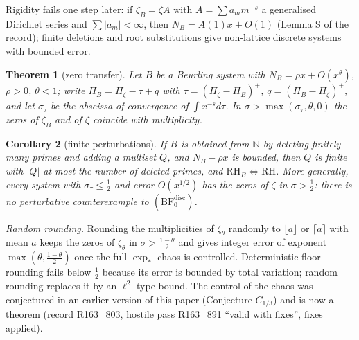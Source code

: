 \documentclass[11pt]{amsart}
\newtheorem{theorem}{Theorem}[section]
\newtheorem{corollary}[theorem]{Corollary}
\theoremstyle{definition}
\theoremstyle{remark}
\newcommand{\N}{\mathbb N}
\begin{document}
\noindent Rigidity fails one step later: if $\zeta_B=\zeta A$ with $A=\sum a_mm^{-s}$ a generalised Dirichlet series and
$\sum|a_m|<\infty$, then $N_B=A(1)x+O(1)$ (Lemma S of the record); finite deletions and root substitutions give
non-lattice discrete systems with bounded error.

\begin{theorem}[zero transfer]\label{thm:zerotransfer}
Let $B$ be a Beurling system with $N_B=\rho x+O(x^\theta)$, $\rho>0$, $\theta<1$; write $\Pi_B=\Pi_\zeta-\tau+q$ with
$\tau=(\Pi_\zeta-\Pi_B)^+$, $q=(\Pi_B-\Pi_\zeta)^+$, and let $\sigma_\tau$ be the abscissa of convergence of
$\int x^{-s}d\tau$. In $\sigma>\max(\sigma_\tau,\theta,0)$ the zeros of $\zeta_B$ and of $\zeta$ coincide with multiplicity.
\end{theorem}

\begin{corollary}[finite perturbations]\label{cor:finitepert}
If $B$ is obtained from $\N$ by deleting finitely many primes and adding a multiset $Q$, and $N_B-\rho x$ is bounded,
then $Q$ is finite with $|Q|$ at most the number of deleted primes, and $\mathrm{RH}_B\iff\mathrm{RH}$. More generally,
every system with $\sigma_\tau\le\frac12$ and error $O(x^{1/2})$ has the zeros of $\zeta$ in $\sigma>\frac12$: there is no
perturbative counterexample to $(\mathrm{BF}^{\mathrm{disc}}_0)$.
\end{corollary}

\emph{Random rounding.} Rounding the multiplicities of $\zeta_\theta$ randomly to $\lfloor a\rfloor$ or
$\lceil a\rceil$ with mean $a$ keeps the zeros of $\zeta_\theta$ in $\sigma>\frac{1-\theta}2$ and gives integer error of
exponent $\max(\theta,\frac{1-\theta}2)$ once the full $\exp_*$ chaos is controlled. Deterministic floor-rounding
\cite[Thm.~6.3]{Broucke2024} fails below $\frac12$ because its error is bounded by total variation; random rounding
replaces it by an $\ell^2$-type bound. The control of the chaos was conjectured in an earlier version of this paper
(Conjecture $C_{1/3}$) and is now a theorem (record R163\_803, hostile pass R163\_891 ``valid with fixes'', fixes applied).
\end{document}
